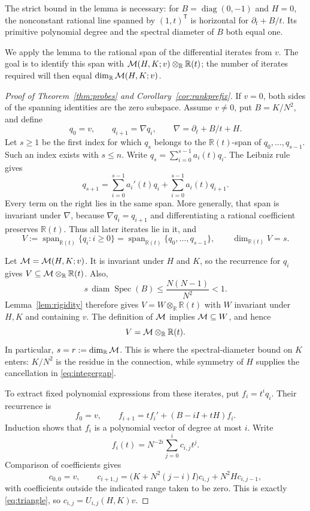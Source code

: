 \documentclass[11pt,letterpaper]{article}
\theoremstyle{definition}\newtheorem{definition}[theorem]{Definition}
\theoremstyle{remark}\newtheorem{remark}[theorem]{Remark}
\DeclareMathOperator{\spanop}{span}\DeclareMathOperator{\im}{im}
\DeclareMathOperator{\diam}{diam}\DeclareMathOperator{\Spec}{Spec}
\newcommand{\R}{\mathbb R}\newcommand{\Q}{\mathbb Q}\newcommand{\Z}{\mathbb Z}
\begin{document}
The strict bound in the lemma is necessary: for
$B=\operatorname{diag}(0,-1)$ and $H=0$, the nonconstant rational line
spanned by $(1,t)^{\mathsf T}$ is horizontal for $\partial_t+B/t$.
Its primitive polynomial degree and the spectral diameter of $B$ both equal one.

We apply the lemma to the rational span of the differential iterates from $v$.
The goal is to identify this span with $\M(H,K;v)\otimes_\R\R(t)$; the number
of iterates required will then equal $\dim_\R\M(H,K;v)$.

\begin{proof}[Proof of Theorem~\ref{thm:probes} and Corollary~\ref{cor:rankprefix}]
If $v=0$, both sides of the spanning identities are the zero subspace. Assume $v\ne0$,
put $B=K/N^2$, and define
\[
q_0=v,\qquad q_{i+1}=\nabla q_i,
\qquad \nabla=\partial_t+B/t+H.
\]
Let $s\ge1$ be the first index for which $q_s$ belongs to the
$\R(t)$-span of $q_0,\ldots,q_{s-1}$. Such an index exists with $s\le n$.
Write $q_s=\sum_{i=0}^{s-1}a_i(t)q_i$. The Leibniz rule gives
\[
q_{s+1}
=\sum_{i=0}^{s-1}a_i'(t)q_i
 +\sum_{i=0}^{s-1}a_i(t)q_{i+1}.
\]
Every term on the right lies in the same span. More generally, that span is
invariant under $\nabla$, because $\nabla q_i=q_{i+1}$ and differentiating
a rational coefficient preserves $\R(t)$. Thus all later iterates lie in it,
and
\[
V:=\spanop_{\R(t)}\{q_i:i\ge0\}
=\spanop_{\R(t)}\{q_0,\ldots,q_{s-1}\},
\qquad \dim_{\R(t)}V=s.
\]

Let $\mathcal M=\mathcal M(H,K;v)$. It is invariant under $H$ and $K$, so the recurrence
for $q_i$ gives $V\subseteq\M\otimes_\R\R(t)$. Also,
\[
s\,\diam\Spec(B)\le\frac{N(N-1)}{N^2}<1.
\]
Lemma~\ref{lem:rigidity} therefore gives $V=W\otimes_\R\R(t)$ with
$W$ invariant under $H,K$ and containing $v$. The definition of $\mathcal M$ implies
$\mathcal M\subseteq W$, and hence
\begin{equation}\label{eq:diffspan}
V=\M\otimes_\R\R(t).
\end{equation}
In particular, $s=r:=\dim_\R\M$.
This is where the spectral-diameter bound on $K$ enters: $K/N^2$ is the
residue in the connection, while symmetry of $H$ supplies the cancellation
in \eqref{eq:integergap}.

To extract fixed polynomial expressions from these iterates, put $f_i=t^iq_i$.
Their recurrence is
\[
f_0=v,\qquad
f_{i+1}=tf_i'+(B-iI+tH)f_i.
\]
Induction shows that $f_i$ is a polynomial vector of degree at most $i$.
Write
\[
f_i(t)=N^{-2i}\sum_{j=0}^i c_{i,j}t^j.
\]
Comparison of coefficients gives
\[
c_{0,0}=v,\qquad
c_{i+1,j}=\bigl(K+N^2(j-i)I\bigr)c_{i,j}
             +N^2Hc_{i,j-1},
\]
with coefficients outside the indicated range taken to be zero. This is
exactly \eqref{eq:triangle}, so $c_{i,j}=U_{i,j}(H,K)v$.


\end{proof}
\end{document}
